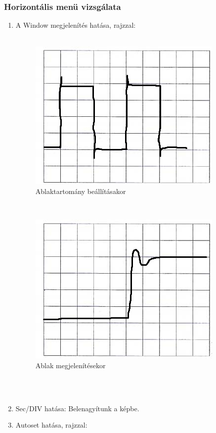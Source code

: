 \documentclass[10pt,a4paper]{article}
\begin{document}
		\subsubsection{Horizontális menü vizsgálata}
		\begin{enumerate}
			\item A Window megjelenítés hatása, rajzzal:
			\\\\
						\begin{figure}[hbtp]
						\centering
				    		 \includegraphics[scale=0.5]{teljes/osc_hor.jpg}
						\caption{Ablaktartomány beállításakor}
						\end{figure}
			\\
					\begin{figure}[hbtp]
					\centering
					\includegraphics[scale=0.5]{teljes/osc_hor_zoom.jpg}
					\caption{Ablak megjelenítésekor}
					\end{figure}\\\\
			\item Sec/DIV hatása: Belenagyítunk a képbe.
			\item Autoset hatása, rajzzal:

\end{enumerate}
\end{document}
